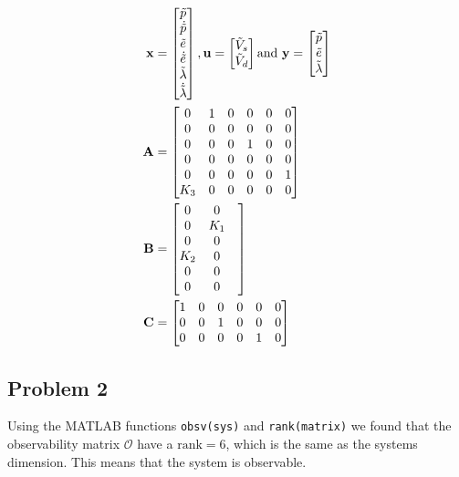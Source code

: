\begin{subequations}
	\begin{align}
		\mbf{x} &= \begin{bmatrix}
			\tilde p\\
			\dot{\tilde p}\\
			\tilde e\\
			\dot{\tilde e}\\
			\tilde \lambda\\
			\dot{\tilde \lambda}
			\end{bmatrix}, 
		\mbf{u} = \begin{bmatrix}
			\tilde V_s\\
			\tilde V_d
			\end{bmatrix} \text{and} \ 
		\mbf{y} = \begin{bmatrix}
			\tilde p\\
			\tilde e\\
			\tilde \lambda
			\end{bmatrix}\\
		\mbf{A} &= \begin{bmatrix}
			0 & 1 & 0 & 0 & 0 & 0\\
			0 & 0 & 0 & 0 & 0 & 0\\ 
			0 & 0 & 0 & 1 & 0 & 0\\
			0 & 0 & 0 & 0 & 0 & 0\\
			0 & 0 & 0 & 0 & 0 & 1\\
			K_3 & 0 & 0 & 0 & 0 & 0
			\end{bmatrix}\\
		\mbf{B} &= \begin{bmatrix}
			0 & 0\\
			0 & K_1 &\\
			0 & 0\\
			K_2 & 0\\
			0 & 0\\
			0 & 0	
			\end{bmatrix}\\
		\mbf{C} &= \begin{bmatrix}
			1 & 0 & 0 & 0 & 0 & 0\\
			0 & 0 & 1 & 0 & 0 & 0\\
			0 & 0 & 0 & 0 & 1 & 0
			\end{bmatrix}
	\end{align}
\end{subequations}

\subsection{Problem 2}
Using the MATLAB functions \texttt{obsv(sys)} and \texttt{rank(matrix)} we found that the observability matrix $\mathcal{O}$ have a $\text{rank} = 6$, which is the same as the systems dimension. This means that the system is observable.

